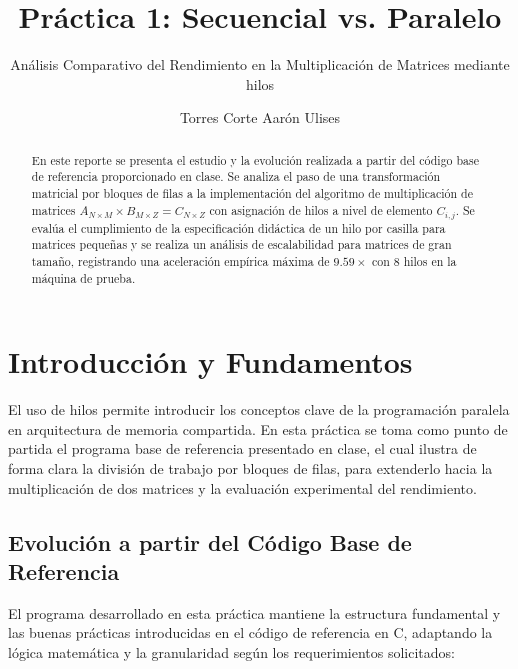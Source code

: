 \documentclass[runningheads]{llncs}
\begin{document}
\title{Práctica 1: Secuencial vs. Paralelo}
\subtitle{Análisis Comparativo del Rendimiento en la Multiplicación de Matrices mediante hilos}

\author{Torres Corte Aarón Ulises}

\maketitle

\begin{abstract}
En este reporte se presenta el estudio y la evolución realizada a partir del código base de referencia proporcionado en clase. Se analiza el paso de una transformación matricial por bloques de filas a la implementación del algoritmo de multiplicación de matrices $A_{N \times M} \times B_{M \times Z} = C_{N \times Z}$ con asignación de hilos a nivel de elemento $C_{i,j}$. Se evalúa el cumplimiento de la especificación didáctica de un hilo por casilla para matrices pequeñas y se realiza un análisis de escalabilidad para matrices de gran tamaño, registrando una aceleración empírica máxima de $9.59\times$ con 8 hilos en la máquina de prueba.

\end{abstract}

\section{Introducción y Fundamentos}
El uso de hilos permite introducir los conceptos clave de la programación paralela en arquitectura de memoria compartida. En esta práctica se toma como punto de partida el programa base de referencia presentado en clase, el cual ilustra de forma clara la división de trabajo por bloques de filas, para extenderlo hacia la multiplicación de dos matrices y la evaluación experimental del rendimiento.

\subsection{Evolución a partir del Código Base de Referencia}

El programa desarrollado en esta práctica mantiene la estructura fundamental y las buenas prácticas introducidas en el código de referencia en C, adaptando la lógica matemática y la granularidad según los requerimientos solicitados:
\end{document}
